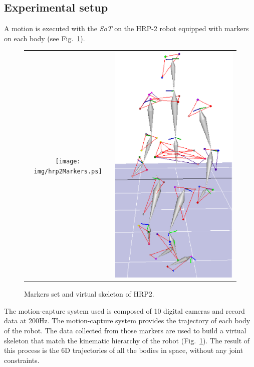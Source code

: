 \documentclass[letterpaper, 10pt, conference]{ieeeconf}      %
\begin{document}
\subsection{Experimental setup}\label{sec:xpset}
A motion is executed with the \emph{SoT} on the HRP-2 robot equipped with markers on each
body (see Fig.~\ref{fig:hrp2Markers}).
\begin{figure}[t]
  \centering
  \begin{tabular}{cc}
    \texttt{[image: img/hrp2Markers.ps]} &
    \includegraphics[height=0.7\linewidth]{img/skel.ps} \\
  \end{tabular}
  \caption{Markers set and virtual skeleton of HRP2.}
  \label{fig:hrp2Markers}
\end{figure}
The motion-capture system used is composed of 10 digital cameras and record data
at 200Hz. 
The motion-capture system provides the trajectory of each body of the robot.
The data collected from those markers
are used to build a virtual skeleton that match the kinematic hierarchy of the robot (Fig.~\ref{fig:hrp2Markers}).
The result of this process is the 6D trajectories of all the bodies in space, without any joint constraints.
\end{document}
